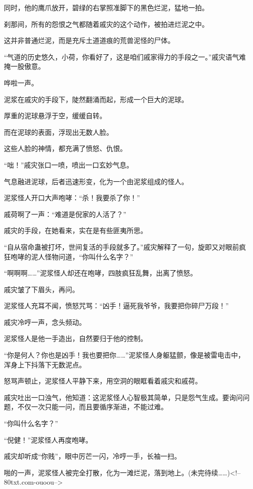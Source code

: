 \begin{this_body}
同时，他的鹰爪放开，碧绿的右掌照准脚下的黑色烂泥，猛地一拍。

刹那间，所有的怨恨之气都随着戚灾的这个动作，被拍进烂泥之中。

这并非普通烂泥，而是充斥土道道痕的荒兽泥怪的尸体。

“气道的历史悠久，小荷，你看好了，这是咱们戚家得力的手段之一。”戚灾语气难掩一股傲意。

哗啦一声。

泥浆在戚灾的手段下，陡然翻涌而起，形成一个巨大的泥球。

厚重的泥球悬浮于空，缓缓自转。

而在泥球的表面，浮现出无数人脸。

这些人脸的神情，都充满了愤怒、仇恨。

“咄！”戚灾张口一喷，喷出一口玄妙气息。

气息融进泥球，后者迅速形变，化为一个由泥浆组成的怪人。

泥浆怪人开口大声咆哮：“杀！我要杀了你！”

戚荷啊了一声：“难道是倪家的人活了？”

戚灾的手段，在她看来，实在是有些匪夷所思。

“自从宿命蛊被打坏，世间复活的手段就多了。”戚灾解释了一句，旋即又对眼前疯狂咆哮的泥人怪物问道，“你叫什么名字？”

“啊啊啊……”泥浆怪人却还在咆哮，四肢疯狂乱舞，出离了愤怒。

戚灾皱了下眉头，再问。

泥浆怪人充耳不闻，愤怒咒骂：“凶手！逼死我爷爷，我要把你碎尸万段！”

戚灾冷哼一声，念头频动。

泥浆怪人是他一手造出，自然要归于他的控制。

“你是何人？你也是凶手！我也要把你……”泥浆怪人身躯猛颤，像是被雷电击中，浑身上下抖落下无数泥点。

怒骂声顿止，泥浆怪人平静下来，用空洞的眼眶看着戚灾和戚荷。

戚灾吐出一口浊气，他知道：这泥浆怪人心智极其简单，只是怨气生成。要询问问题，不仅一次只能一问，而且要循序渐进，不能过难。

“你叫什么名字？”

“倪健！”泥浆怪人再度咆哮。

戚灾却听成“你贱”，眼中厉芒一闪，冷哼一手，长袖一扫。

啪的一声，泥浆怪人被完全打散，化为一滩烂泥，落到地上。(未完待续……)<!--80txt.com-ouoou-->

\end{this_body}

